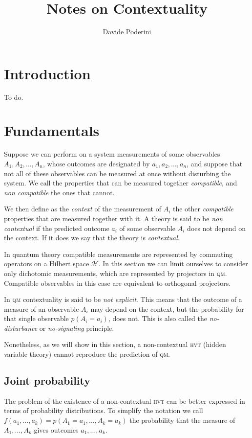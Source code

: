 \documentclass[a4paper]{article}
\newcommand{\Hil}{\mathcal{H}}
\newcommand{\acron}[1]{\textsc{#1}}
\newcommand{\HVT}{\acron{hvt}}
\newcommand{\QM}{\acron{qm}}
\theoremstyle{definition}
\begin{document}
\title{Notes on Contextuality}
\author{Davide Poderini}
\date{}
\maketitle

\section{Introduction}
To do.
\section{Fundamentals}
Suppose we can perform on a system measurements of some observables $A_1, A_2,\ldots, A_n$,
whose outcomes are designated by $a_1, a_2, \ldots, a_n$, and suppose that not all of these
observables can be measured at once without disturbing the system.
We call the properties that can be measured together \emph{compatible}, and
\emph{non compatible} the ones that cannot.

We then define as the \emph{context} of the measurement of $A_i$ the other
\emph{compatible} properties that are measured together with it.
A theory is said to be \emph{non contextual} if the predicted outcome $a_i$ of some observable
$A_i$ does not depend on the context.
If it does we say that the theory is \emph{contextual}.

In quantum theory compatible measurements are represented by commuting operators
on a Hilbert space $\Hil$. 
In this section we can limit ourselves to consider only dichotomic
measurements, which are represented by projectors in \QM{}.
Compatible observables in this case are equivalent to orthogonal projectors.

In \QM{} contextuality is said to be \emph{not explicit}. This means that the outcome of a measure of an
observable $A_i$ may depend on the context, but the probability for that single
observable $p(A_i = a_i)$, does not.
This is also called the \emph{no-disturbance} or \emph{no-signaling} principle.

Nonetheless, as we will show in this section, a non-contextual \HVT{} (hidden
variable theory) cannot reproduce the prediction of \QM{}.

\subsection{Joint probability}
\label{sec:joint_prob}
The problem of the existence of a non-contextual \HVT{} can be better
expressed in terms of probability distributions.
To simplify the notation we call $f(a_1,\ldots,a_k) = p(A_1=a_1, \ldots,
A_k=a_k)$ the probability that the measure of $A_1,\ldots,A_k$ gives outcomes
$a_1,\ldots,a_k$.
\end{document}
